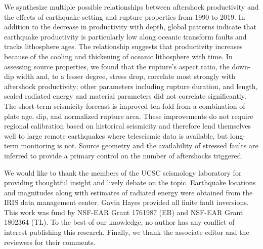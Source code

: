 \documentclass[draft, jgrga]{agujournal2018}
\begin{document}
We synthesize multiple possible relationships between aftershock productivity and the effects of earthquake setting and rupture properties from 1990 to 2019. In addition to the decrease in productivity with depth, global patterns indicate that earthquake productivity is particularly low along oceanic transform faults and tracks lithosphere ages. The relationship suggests that productivity increases because of the cooling and thickening of oceanic lithosphere with time. In assessing source properties, we found that the rupture's aspect ratio, the down-dip width and, to a lesser degree, stress drop, correlate most strongly with aftershock productivity; other parameters including rupture duration, and length, scaled radiated energy and material parameters did not correlate significantly. The short-term seismicity forecast is improved ten-fold from a combination of plate age, dip, and normalized rupture area. These improvements do not require regional calibration based on historical seismicity and therefore lend themselves well to large remote earthquakes where teleseismic data is available, but long-term monitoring is not. Source geometry and the availability of stressed faults are inferred to provide a primary control on the number of aftershocks triggered.

\acknowledgments

We would like to thank the members of the UCSC seismology laboratory for providing thoughtful insight and lively debate on the topic. Earthquake locations and magnitudes along with estimates of radiated energy were obtained from the IRIS data management center. Gavin Hayes provided all finite fault inversions. This work was fund by NSF-EAR Grant 1761987 (EB) and NSF-EAR Grant 1802364 (TL). To the best of our knowledge, no author has any conflict of interest publishing this research. Finally, we thank the associate editor and the reviewers for their comments.


\end{document}
